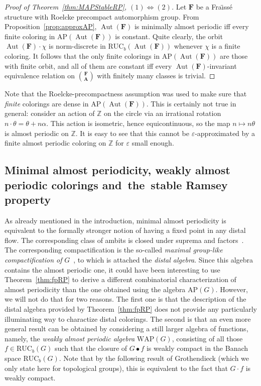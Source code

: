\documentclass[11pt]{article}
\theoremstyle{definition}
\numberwithin{equation}{section}
\numberwithin{figure}{section}
\numberwithin{table}{section}
\newcommand{\Z}{\mathbb{Z}}
\newcommand*{\mA}{\mathbf{A}}
\newcommand*{\mF}{\mathbf{F}}
\newcommand{\e}{\varepsilon}
\DeclareMathOperator{\Aut}{Aut}
\newcommand{\RUCB}{\mathrm{RUC}_{b}}
\newcommand{\WAP}{\mathrm{WAP}}
\begin{document}
\begin{proof}[Proof of Theorem~\ref{thm:MAPStableRP}, $(1) \Leftrightarrow (2)$]
Let $\mF$ be a Fra\"{\i}ss\'e structure with Roelcke precompact automorphism group. From Proposition~\ref{prop:approxAP}, $\Aut(\mF)$ is minimally almost periodic iff every finite coloring in $\mathrm{AP}(\Aut(\mF))$ is constant. Quite clearly, the orbit $\Aut(\mF)\cdot \chi$ is norm-discrete in $\RUCB(\Aut(\mF))$ whenever $\chi$ is a finite coloring. It follows that the only finite colorings in $\mathrm{AP}(\Aut(\mF))$ are those with finite orbit, and all of them are constant iff every $\Aut(\mF)$-invariant equivalence relation on $\binom{\mF}{\mA}$ with finitely many classes is trivial.
\end{proof}

Note that the Roelcke-precompactness assumption was used to make sure that \emph{finite} colorings are dense in $\mathrm{AP}(\Aut(\mF))$. This is certainly not true in general: consider an action of $\Z$ on the circle via an irrational rotation $n\cdot \theta = \theta + n\alpha$. This action is isometric, hence equicontinuous, so the map $n\mapsto n\theta$ is almost periodic on $\Z$. It is easy to see that this cannot be $\e$-approximated by a finite almost periodic coloring on $\Z$ for $\e$ small enough.

\subsection{Minimal almost periodicity, weakly almost periodic colorings and~the~stable Ramsey property}
\label{subsection:WAP}

As already mentioned in the introduction, minimal almost periodicity is equivalent to the formally stronger notion of having a fixed point in any distal flow. The corresponding class of ambits is closed under suprema and factors~\cite[Chapter~IV, Section~2.27]{dV}. The corresponding compactification is the so-called \emph{maximal group-like compactification of} $G$~\cite[Chapter~IV, Section~6.18]{dV}, to which is attached the \emph{distal algebra}. Since this algebra contains the almost periodic one, it could have been interesting to use Theorem~\ref{thm:fpRP} to derive a different combinatorial characterization of almost periodicity than the one obtained using the algebra $\mathrm{AP}(G)$. However, we will not do that for two reasons. The first one is that the description of the distal algebra provided by Theorem~\ref{thm:fpRP} does not provide any particularly illuminating way to charactize distal colorings. The second is that an even more general result can be obtained by considering a still larger algebra of functions, namely, the \emph{weakly almost periodic algebra} $\WAP(G)$, consisting of all those $f\in \RUCB(G)$ such that the closure of $G\bullet f$ is weakly compact in the Banach space $\RUCB(G)$. Note that by the following result of Grothendieck (which we only state here for topological groups), this is equivalent to the fact that $G\cdot f$ is weakly compact.
\end{document}
